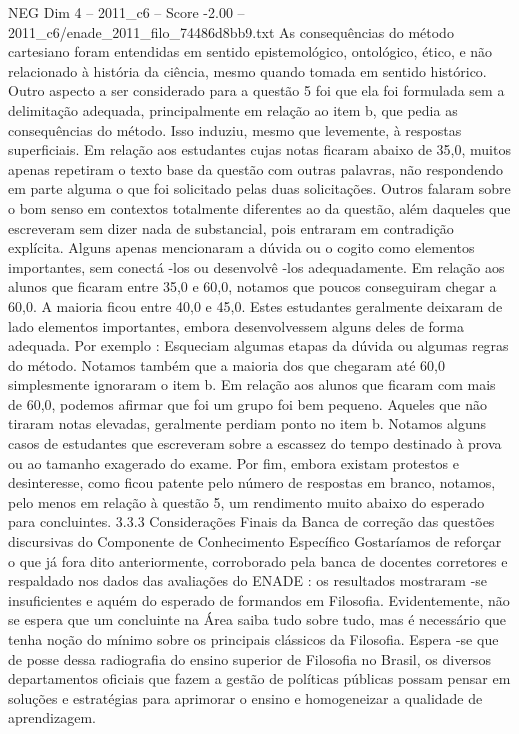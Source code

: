 \begin{textsample}{NEG Dim 4 – 2011\_c6 – Score -2.00 – 2011\_c6/enade\_2011\_filo\_74486d8bb9.txt}
As consequências do método cartesiano foram entendidas em sentido epistemológico, ontológico, ético, e não relacionado à história da ciência, mesmo quando tomada em sentido histórico.
Outro aspecto a ser considerado para a questão 5 foi que ela foi formulada sem a delimitação adequada, principalmente em relação ao item b, que pedia as consequências do método.
Isso induziu, mesmo que levemente, à respostas superficiais.
Em relação aos estudantes cujas notas ficaram abaixo de 35,0, muitos apenas repetiram o texto base da questão com outras palavras, não respondendo em parte alguma o que foi solicitado pelas duas solicitações.
Outros falaram sobre o bom senso em contextos totalmente diferentes ao da questão, além daqueles que escreveram sem dizer nada de substancial, pois entraram em contradição explícita.
Alguns apenas mencionaram a dúvida ou o cogito como elementos importantes, sem conectá -los ou desenvolvê -los adequadamente.
Em relação aos alunos que ficaram entre 35,0 e 60,0, notamos que poucos conseguiram chegar a 60,0.
A maioria ficou entre 40,0 e 45,0.
Estes estudantes geralmente deixaram de lado elementos importantes, embora desenvolvessem alguns deles de forma adequada.
Por exemplo : Esqueciam algumas etapas da dúvida ou algumas regras do método.
Notamos também que a maioria dos que chegaram até 60,0 simplesmente ignoraram o item b.
Em relação aos alunos que ficaram com mais de 60,0, podemos afirmar que foi um grupo foi bem pequeno.
Aqueles que não tiraram notas elevadas, geralmente perdiam ponto no item b.
Notamos alguns casos de estudantes que escreveram sobre a escassez do tempo destinado à prova ou ao tamanho exagerado do exame.
Por fim, embora existam protestos e desinteresse, como ficou patente pelo número de respostas em branco, notamos, pelo menos em relação à questão 5, um rendimento muito abaixo do esperado para concluintes. 3.3.3 Considerações Finais da Banca de correção das questões discursivas do Componente de Conhecimento Específico Gostaríamos de reforçar o que já fora dito anteriormente, corroborado pela banca de docentes corretores e respaldado nos dados das avaliações do ENADE : os resultados mostraram -se insuficientes e aquém do esperado de formandos em Filosofia.
Evidentemente, não se espera que um concluinte na Área saiba tudo sobre tudo, mas é necessário que tenha noção do mínimo sobre os principais clássicos da Filosofia.
Espera -se que de posse dessa radiografia do ensino superior de Filosofia no Brasil, os diversos departamentos oficiais que fazem a gestão de políticas públicas possam pensar em soluções e estratégias para aprimorar o ensino e homogeneizar a qualidade de aprendizagem.

\end{textsample}
